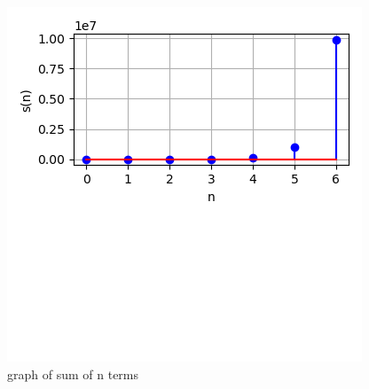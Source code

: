 \documentclass[journal,12pt,twocolumn]{IEEEtran}
\begin{document}
\begin{figure}[h!]
    \centering
    \includegraphics[width=\columnwidth]{figs/plot.png}
    \caption{graph of sum of n terms}
    \label{fig:1}
\end{figure}
 
\end{document}
